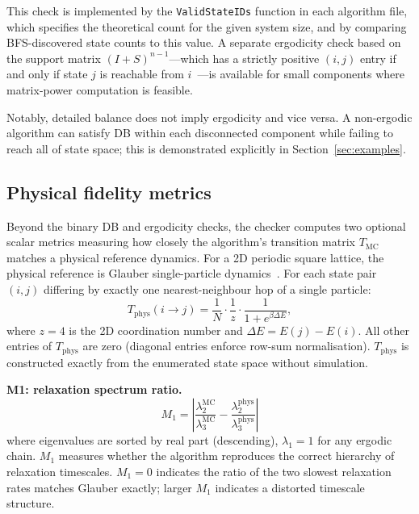\documentclass[twocolumn,10pt]{article}
\begin{document}
This check is implemented by the \texttt{ValidStateIDs} function in each
algorithm file, which specifies the theoretical count for the given system
size, and by comparing BFS-discovered state counts to this value.  A separate
ergodicity check based on the support matrix $(I+S)^{n-1}$---which has a
strictly positive $(i,j)$ entry if and only if state $j$ is reachable from
$i$~\cite{HornJohnson1985}---is available for small components where
matrix-power computation is feasible.

Notably, detailed balance does not imply ergodicity and vice versa.  A
non-ergodic algorithm can satisfy DB within each disconnected component while
failing to reach all of state space; this is demonstrated explicitly in
Section~\ref{sec:examples}.

\subsection{Physical fidelity metrics}
\label{sec:fidelity}

Beyond the binary DB and ergodicity checks, the checker computes two optional
scalar metrics measuring how closely the algorithm's transition matrix $T_\mathrm{MC}$
matches a physical reference dynamics.  For a 2D periodic square lattice, the
physical reference is Glauber single-particle dynamics~\cite{Glauber1963}.
For each state pair $(i,j)$ differing by exactly one nearest-neighbour hop
of a single particle:
\begin{equation}
  T_\mathrm{phys}(i\to j) = \frac{1}{N} \cdot \frac{1}{z}
  \cdot \frac{1}{1+e^{\beta\Delta E}},
  \label{eq:glauber}
\end{equation}
where $z=4$ is the 2D coordination number and $\Delta E = E(j)-E(i)$.
All other entries of $T_\mathrm{phys}$ are zero (diagonal entries enforce
row-sum normalisation).  $T_\mathrm{phys}$ is constructed exactly from the
enumerated state space without simulation.

\medskip\noindent\textbf{M1: relaxation spectrum ratio.}
\begin{equation}
  M_1 = \left|\frac{\lambda_2^\mathrm{MC}}{\lambda_3^\mathrm{MC}} -
  \frac{\lambda_2^\mathrm{phys}}{\lambda_3^\mathrm{phys}}\right|
  \label{eq:M1}
\end{equation}
where eigenvalues are sorted by real part (descending), $\lambda_1=1$ for any
ergodic chain.  $M_1$ measures whether the algorithm reproduces the correct
hierarchy of relaxation timescales.  $M_1=0$ indicates the ratio of the two
slowest relaxation rates matches Glauber exactly; larger $M_1$ indicates a
distorted timescale structure.
\end{document}
